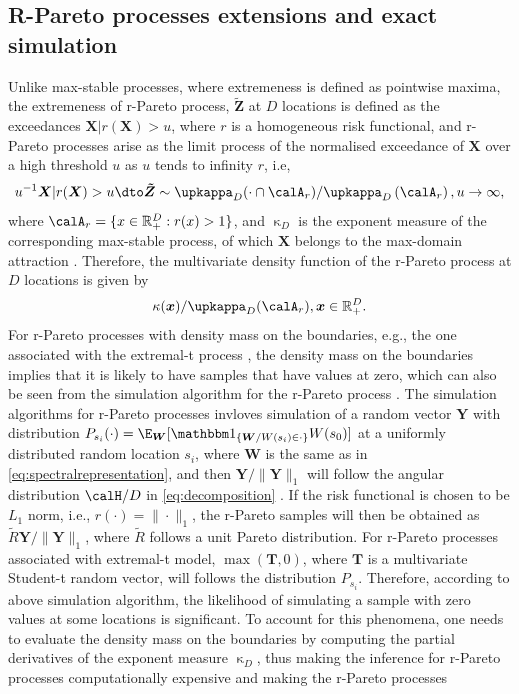 \documentclass[12pt]{article}
\begin{document}
\subsection{R-Pareto processes extensions and exact simulation}
Unlike max-stable processes, where extremeness is defined as pointwise maxima, the extremeness of r-Pareto process, $\bm{\tilde Z}$ at $D$ locations is defined as the exceedances $\bm X | r(\bm X) > u $, where $r$ is a homogeneous risk functional, and r-Pareto processes arise as the limit process of the normalised exceedance of $\bm X$ over a high threshold $u$ as $u$ tends to infinity $r$, i.e,
\begin{equation}\label{eq:rp_distribution}    
    u^{-1} \bm X |  r(\bm X) > u \dto \bm{\tilde Z} \sim \upkappa_D(\cdot\cap \calA_r )/\upkappa_D\left(\calA_r\right), u\to\infty,
\end{equation}
where $\calA_r=\{x \in \mathbb R_+^D:r(x)>1\}$, and $\upkappa_D$ is the exponent measure of the corresponding max-stable process, of which $\bm X$ belongs to the max-domain attraction \citep{Dombry.Ribatet:2015,deFondeville.Davison:2018,Dombry.etal:2024}. Therefore, the multivariate density function of the r-Pareto process at $D$ locations is given by
\begin{equation}\label{eq:rp_density}
    \kappa(\bm x)/\upkappa_D(\calA_r), \bm x\in\mathbb R_+^D.    
\end{equation}
For r-Pareto processes with density mass on the boundaries, e.g., the one associated with the extremal-t process \citep{Thibaud.Opitz:2015}, the density mass on the boundaries implies that it is likely to have samples that have values at zero, which can also be seen from the simulation algorithm for the r-Pareto process \citep{Dombry.etal:2024}. The simulation algorithms for r-Pareto processes invloves simulation of a random vector $\bm Y$ with distribution $P_{s_i}(\cdot) = \E_{\bm W}[\mathbbm 1_{\{\bm W/W(s_i)\in \cdot\}}W(s_0)]$ at a uniformly distributed random location $s_i$, where $\bm W$ is the same as in \eqref{eq:spectralrepresentation}, and then $\bm Y/\|\bm Y\|_1$ will follow the angular distribution $\calH/D$ in \eqref{eq:decomposition} \citep[Theorem 2]{Dombry.Engelke.Oesting:2016}. If the risk functional is chosen to be $L_1$ norm, i.e., $r(\cdot)=\|\cdot\|_1$,  the r-Pareto samples will then be obtained as $\tilde R\bm Y/\|\bm Y\|_1$, where $\tilde R$ follows a unit Pareto distribution. For r-Pareto processes associated with extremal-t model, $\max(\bm T,0)$, where $\bm T$ is a multivariate Student-t random vector, will follows the distribution $P_{s_i}$. Therefore, according to above simulation algorithm, the likelihood of simulating a sample with zero values at some locations is significant. To account for this phenomena, one needs to evaluate the density mass on the boundaries by computing the partial derivatives of the exponent measure $\upkappa_D$, thus making the inference for r-Pareto processes computationally expensive and making the r-Pareto processes    
\end{document}
